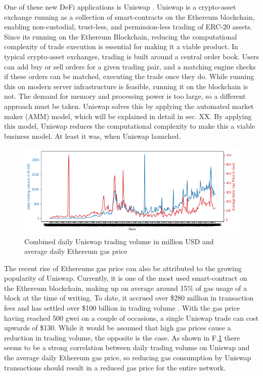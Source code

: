 \documentclass[../thesis.tex]{subfiles}
\begin{document}
One of these new DeFi applications is Uniswap \cite{adams2020uniswap}. Uniswap is a crypto-asset exchange running as a collection of smart-contracts on the Ethereum blockchain, enabling non-custodial, trust-less, and permission-less trading of ERC-20 assets. Since its running on the Ethereum Blockchain, reducing the computational complexity of trade execution is essential for making it a viable product. In typical crypto-asset exchanges, trading is built around a central order book. Users can add buy or sell orders for a given trading pair, and a matching engine checks if these orders can be matched, executing the trade once they do. While running this on modern server infrastructure is feasible, running it on the blockchain is not. The demand for memory and processing power is too large, so a different approach must be taken. Uniswap solves this by applying the automated market maker (AMM) model, which will be explained in detail in sec. XX. By applying this model, Uniswap reduces the computational complexity to make this a viable business model. At least it was, when Uniswap launched. 

\begin{figure}[h]
    \centerline{\includegraphics[totalheight=5.6cm]{diagrams/gas_volume.png}}
    \caption{Combined daily Uniswap trading volume in million USD and average daily Ethereum gas price}
    \label{fig:gas_vol}
\end{figure}

The recent rise of Ethereums gas price \cite{gasprice} can also be attributed to the growing popularity of Uniswap. Currently, it is one of the most used smart-contract on the Ethereum blockchain, making up on average around 15\% of gas \cite{eth_gas_guzzlers} usage of a block at the time of writing. To date, it accrued over \$280 million in transaction fees \cite{uniswap_tx_fees} and has settled over \$100 billion in trading volume \cite{cummulative_vol}. With the gas price having reached 500 gwei on a couple of occasions, a single Uniswap trade can cost upwards of \$130. While it would be assumed that high gas prices cause a reduction in trading volume, the opposite is the case. As shown in F.\ref{fig:gas_vol} there seems to be a strong correlation between daily trading volume on Uniswap and the average daily Ethereum gas price, so reducing gas consumption by Uniswap transactions should result in a reduced gas price for the entire network.
\end{document}
